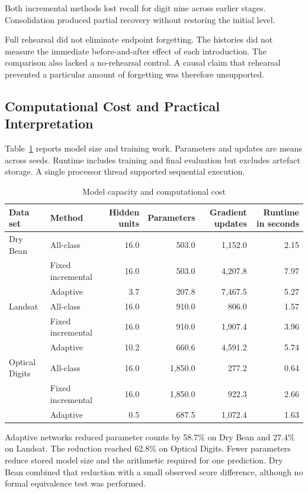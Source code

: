 \documentclass[conference,10pt]{IEEEtran}
\begin{document}
Both incremental methods lost recall for digit nine across earlier stages. Consolidation produced partial recovery without restoring the initial level.

Full rehearsal did not eliminate endpoint forgetting. The histories did not measure the immediate before-and-after effect of each introduction. The comparison also lacked a no-rehearsal control. A causal claim that rehearsal prevented a particular amount of forgetting was therefore unsupported.

\subsection{Computational Cost and Practical Interpretation}

Table~\ref{tab:cost} reports model size and training work. Parameters and updates are means across seeds. Runtime includes training and final evaluation but excludes artefact storage. A single processor thread supported sequential execution.

\begin{table}[t]
\caption{Model capacity and computational cost}
\label{tab:cost}
\centering
\begin{tabular}{@{}llrrrr@{}}
\toprule
Data set & Method & Hidden units & Parameters & Gradient updates & Runtime in seconds \\
\midrule
Dry Bean & All-class & 16.0 & 503.0 & 1,152.0 & 2.15 \\
 & Fixed incremental & 16.0 & 503.0 & 4,207.8 & 7.97 \\
 & Adaptive & 3.7 & 207.8 & 7,467.5 & 5.27 \\
Landsat & All-class & 16.0 & 910.0 & 806.0 & 1.57 \\
 & Fixed incremental & 16.0 & 910.0 & 1,907.4 & 3.96 \\
 & Adaptive & 10.2 & 660.6 & 4,591.2 & 5.74 \\
Optical Digits & All-class & 16.0 & 1,850.0 & 277.2 & 0.64 \\
 & Fixed incremental & 16.0 & 1,850.0 & 922.3 & 2.66 \\
 & Adaptive & 0.5 & 687.5 & 1,072.4 & 1.63 \\
\bottomrule
\end{tabular}
\end{table}

Adaptive networks reduced parameter counts by 58.7\% on Dry Bean and 27.4\% on Landsat. The reduction reached 62.8\% on Optical Digits. Fewer parameters reduce stored model size and the arithmetic required for one prediction. Dry Bean combined that reduction with a small observed score difference, although no formal equivalence test was performed.
\end{document}
